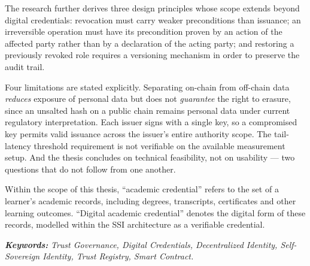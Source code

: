 {The research further derives three design principles whose scope extends beyond digital credentials: revocation must carry weaker preconditions than issuance; an irreversible operation must have its precondition proven by an action of the affected party rather than by a declaration of the acting party; and restoring a previously revoked role requires a versioning mechanism in order to preserve the audit trail.

Four limitations are stated explicitly. Separating on-chain from off-chain data \emph{reduces} exposure of personal data but does not \emph{guarantee} the right to erasure, since an unsalted hash on a public chain remains personal data under current regulatory interpretation. Each issuer signs with a single key, so a compromised key permits valid issuance across the issuer's entire authority scope. The tail-latency threshold requirement is not verifiable on the available measurement setup. And the thesis concludes on technical feasibility, not on usability --- two questions that do not follow from one another.

Within the scope of this thesis, {``}academic credential{''} refers to the set of a learner's academic records, including degrees, transcripts, certificates and other learning outcomes. {``}Digital academic credential{''} denotes the digital form of these records, modelled within the SSI architecture as a verifiable credential.

\vspace{0.5cm}
\textit{\textbf{Keywords:}} \textit{Trust Governance, Digital Credentials, Decentralized Identity, Self-Sovereign Identity, Trust Registry, Smart Contract.}
}
